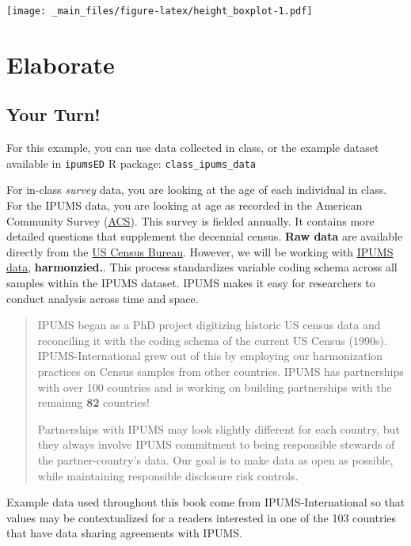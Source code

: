 \documentclass[
]{book}
\begin{document}
\texttt{[image: \_main\_files/figure-latex/height\_boxplot-1.pdf]}

\hypertarget{elaborate}{%
\section{Elaborate}\label{elaborate}}

\hypertarget{your-turn}{%
\subsection{Your Turn!}\label{your-turn}}

For this example, you can use data collected in class, or the example dataset available in \texttt{ipumsED} R package: \texttt{class\_ipums\_data}

For in-class \emph{survey} data, you are looking at the age of each individual in class.
For the IPUMS data, you are looking at age as recorded in the American Community Survey
(\href{https://www.census.gov/programs-surveys/acs}{ACS}). This survey is fielded
annually. It contains more detailed questions that supplement the decennial census. \textbf{Raw data} are available directly from the \href{https://www.census.gov/programs-surveys/acs/data.html}{US Census Bureau}. However, we will be working with \href{https://ipums.org}{IPUMS data}, \textbf{harmonzied.}. This process standardizes variable coding schema across all samples within the IPUMS dataset. IPUMS makes it easy for researchers to conduct analysis across time and space.

\begin{quote}
IPUMS began as a PhD project digitizing historic US census data and reconciling
it with the coding schema of the current US Census (1990s). IPUMS-International grew out
of this by employing our harmonization practices on Census samples from other countries.
IPUMS has partnerships with over 100 countries and is working on building partnerships with the
remainng \textbf{82} countries!

Partnerships with IPUMS may look slightly different for each country, but they always
involve IPUMS commitment to being responsible stewards of the partner-country's data.
Our goal is to make data as open as possible, while maintaining responsible disclosure risk controls.
\end{quote}

Example data used throughout this book come from IPUMS-International so that values may be contextualized for a readers interested in one of the 103 countries that have data sharing agreements with IPUMS.
\end{document}
